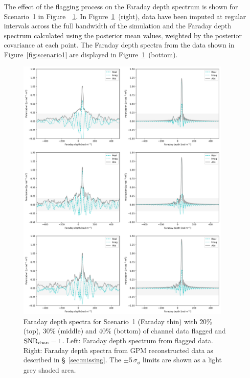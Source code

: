 \documentclass[fleqn,usenatbib]{mnras}
\begin{document}
The effect of the flagging process on the Faraday depth spectrum is shown for Scenario~1 in Figure~~\ref{fig:flagging1}. In Figure~\ref{fig:flagging1}~(right), data have been imputed at regular intervals across the full bandwidth of the simulation and the Faraday depth spectrum calculated using the posterior mean values, weighted by the posterior covariance at each point. The Faraday depth spectra from the data shown in Figure~\ref{fig:scenario1} are displayed in Figure~\ref{fig:flagging1}~(bottom).
%
\begin{figure}
\centerline{\includegraphics[width=0.95\textwidth]{./FIGURES/figure6.png}}
\caption{\label{fig:flagging1} Faraday depth spectra for Scenario~1 (Faraday thin) with 20\% (top), 30\% (middle) and 40\% (bottom) of channel data flagged and ${\rm SNR}_{\rm chan} = 1$. Left: Faraday depth spectrum from flagged data. Right: Faraday depth spectra from GPM reconstructed data as described in \S~\ref{sec:missing}. The $\pm$5\,$\sigma_{\phi}$ limits are shown as a light grey shaded area.}
\end{figure}
\end{document}
